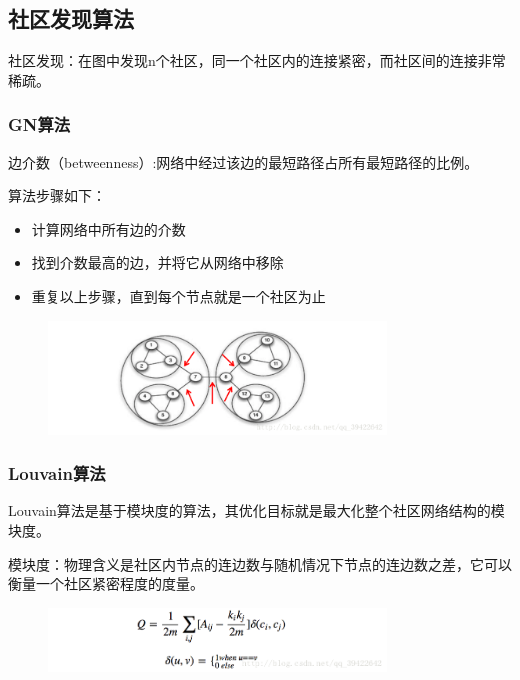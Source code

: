 \documentclass[12pt]{report}
\begin{document}
		\subsection{社区发现算法}
			
			社区发现：在图中发现n个社区，同一个社区内的连接紧密，而社区间的连接非常稀疏。
			
			\subsubsection{GN算法}
			
				边介数（betweenness）:网络中经过该边的最短路径占所有最短路径的比例。
				
				算法步骤如下：
				\begin{itemize}
					\item 计算网络中所有边的介数
					\item 找到介数最高的边，并将它从网络中移除 
					\item 重复以上步骤，直到每个节点就是一个社区为止
				\end{itemize}
				
				\begin{figure}[htbp]
					\centering
					\includegraphics[width=0.8\textwidth]{img/GN.png}
				\end{figure}
			
			\subsubsection{Louvain算法}
			
				Louvain算法是基于模块度的算法，其优化目标就是最大化整个社区网络结构的模块度。
				
				模块度：物理含义是社区内节点的连边数与随机情况下节点的连边数之差，它可以衡量一个社区紧密程度的度量。
				
				\begin{figure}[htbp]
					\centering
					\includegraphics[width=0.8\textwidth]{img/Louvain.png}
				\end{figure}
				
\end{document}
